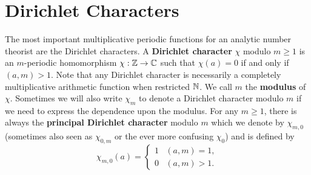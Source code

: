   \section{Dirichlet Characters}
    The most important multiplicative periodic functions for an analytic number theorist are the Dirichlet characters. A \textbf{Dirichlet character} $\chi$ modulo $m \ge 1$ is an $m$-periodic homomorphism $\chi:\mathbb{Z} \to \mathbb{C}$ such that $\chi(a) = 0$ if and only if $(a,m) > 1$. Note that any Dirichlet character is necessarily a completely multiplicative arithmetic function when restricted $\mathbb{N}$. We call $m$ the \textbf{modulus} of $\chi$. Sometimes we will also write $\chi_{m}$ to denote a Dirichlet character modulo $m$ if we need to express the dependence upon the modulus. For any $m \ge 1$, there is always the \textbf{principal Dirichlet character} modulo $m$ which we denote by $\chi_{m,0}$ (sometimes also seen as $\chi_{0,m}$ or the ever more confusing $\chi_{0}$) and is defined by
    \[
      \chi_{m,0}(a) = \begin{cases} 1 & (a,m) = 1, \\ 0 & (a,m) > 1. \end{cases}
    \]
